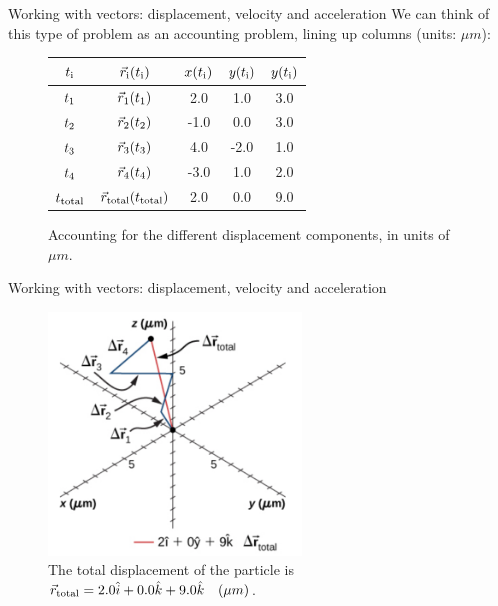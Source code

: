 \documentclass{beamer}
\begin{document}
\begin{frame}{Working with vectors: displacement, velocity and acceleration}
We can think of this type of problem as an accounting problem, lining up columns (units: $\mu m$):
\begin{figure}
\begin{tabular}{| c | c | c | c | c |}
\hline
$t_{\rm i}$ & $\vec{r}_{\rm i}(t_{\rm i})$ & $x(t_{\rm i})$ & $y(t_{\rm i})$ & $y(t_{\rm i})$ \\
\hline
$t_{\rm 1}$ & $\vec{r}_{\rm 1}(t_{\rm 1})$ & 2.0 & 1.0 & 3.0 \\
\hline
$t_{\rm 2}$ & $\vec{r}_{\rm 2}(t_{\rm 2})$ & -1.0 & 0.0 & 3.0 \\
\hline
$t_{\rm 3}$ & $\vec{r}_{\rm 3}(t_{\rm 3})$ & 4.0 & -2.0 & 1.0 \\
\hline
$t_{\rm 4}$ & $\vec{r}_{\rm 4}(t_{\rm 4})$ & -3.0 & 1.0 & 2.0 \\
\hline
\hline
$t_{\rm total}$ & $\vec{r}_{\rm total}(t_{\rm total})$ & 2.0 & 0.0 & 9.0 \\
\hline
\end{tabular}
\caption{\label{tab:account} Accounting for the different displacement components, in units of $\mu m$.}
\end{figure}
\end{frame}

\begin{frame}{Working with vectors: displacement, velocity and acceleration}
\begin{figure}
\centering
\includegraphics[width=0.6\textwidth]{figures/Brownian.png}
\caption{\label{fig:brown2} The total displacement of the particle is $\vec{r}_{\rm total} = 2.0\hat{i} + 0.0\hat{k} + 9.0\hat{k}\quad (\mu m)$.}
\end{figure}
\end{frame}
\end{document}
